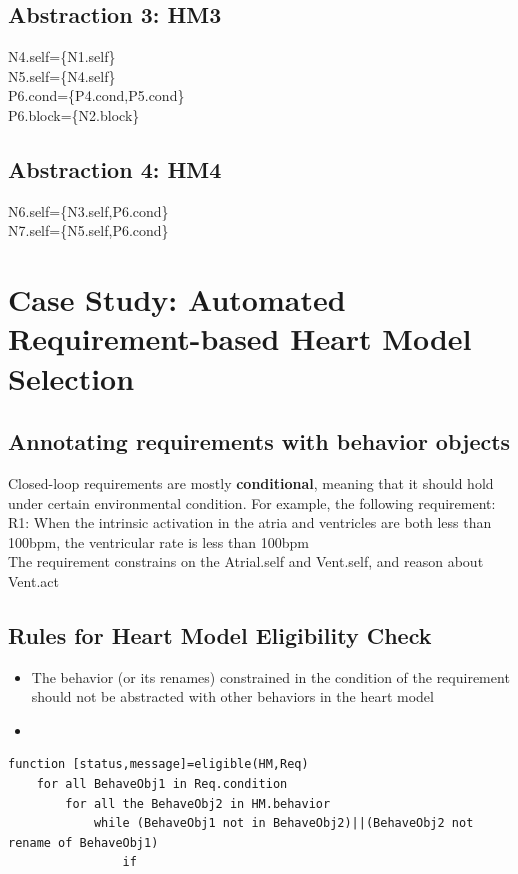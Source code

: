 \documentclass{llncs}
\begin{document}
\subsection{Abstraction 3: HM3}
\textsf{N4.self=\{N1.self\}\\
N5.self=\{N4.self\}\\
P6.cond=\{P4.cond,P5.cond\}\\
P6.block=\{N2.block\}}
\subsection{Abstraction 4: HM4}
\textsf{N6.self=\{N3.self,P6.cond\}\\
N7.self=\{N5.self,P6.cond\}}
\section{Case Study: Automated Requirement-based Heart Model Selection}
\subsection{Annotating requirements with behavior objects}
Closed-loop requirements are mostly \textbf{conditional}, meaning that it should hold under certain environmental condition. For example, the following requirement:\\
\textsf{R1: When the intrinsic activation in the atria and ventricles are both less than 100bpm, the ventricular rate is less than 100bpm}\\
The requirement constrains on the \textsf{Atrial.self} and \textsf{Vent.self}, and reason about \textsf{Vent.act}


\subsection{Rules for Heart Model Eligibility Check}

\begin{itemize}
	\item The behavior (or its renames) constrained in the condition of the requirement should not be abstracted with other behaviors in the heart model
    \item 
    
\end{itemize}

\begin{Verbatim}
function [status,message]=eligible(HM,Req)
	for all BehaveObj1 in Req.condition
    	for all the BehaveObj2 in HM.behavior
        	while (BehaveObj1 not in BehaveObj2)||(BehaveObj2 not rename of BehaveObj1)
            	if 
\end{Verbatim}
\end{document}
